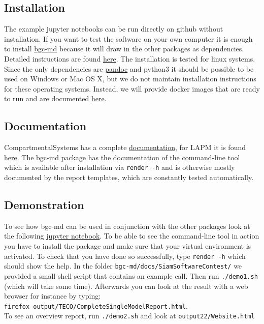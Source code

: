 \documentclass[a4paper]{article}
\begin{document}
\subsection{Installation}
The example jupyter notebooks can be run directly on github without installation. 
If you want to test the software on your own computer it is enough to install \href{https://github.com/MPIBGC-TEE/bgc-md}{bgc-md} because it will draw in the other packages as dependencies. Detailed instructions are found \href{https://github.com/MPIBGC-TEE/bgc-md#installation}{here}.
The installation is tested for linux systems. 
Since the only dependencies are \href{https://pandoc.org/installing.html}{pandoc} and python3 
it should be possible to be used on Windows or Mac OS X, but we do not maintain installation instructions for these operating systems.
Instead, we will provide docker images that are ready to run and are documented \href{https://github.com/MPIBGC-TEE/bgc-md/blob/master/docker_images/Readme.md}{here}. 


\subsection{Documentation}
CompartmentalSystems has a complete \href{http://compartmentalsystems.readthedocs.io/en/latest/}{documentation}, 
for LAPM it is found \href{http://lapm.readthedocs.io/en/latest/}{here}. 
The bgc-md package has the documentation of the command-line tool which is available after installation via  \texttt{render -h} 
and is otherwise mostly documented by the report templates, which are constantly tested automatically.

\subsection{Demonstration}
To see how bgc-md can be used in conjunction with the other packages look at the following \href{https://github.com/MPIBGC-TEE/bgc-md/blob/master/jupyter_notebooks/Examples/how_to_apply_toolkit_to_yaml_model.ipynb}{jupyter notebook}.
To be able to see the command-line tool in action you have to install the package and make sure that your virtual environment is activated. 
To check that you have done so successfully, type \texttt{render -h} which should show the help.
In the folder \texttt{bgc-md/docs/SiamSoftwareContest/} we provided a small shell script that contains an example call. 
Then run \texttt{./demo1.sh} (which will take some time).
Afterwards you can look at the result with a web browser for instance by typing:\\
\texttt{firefox output/TECO/CompleteSingleModelReport.html}.\\
To see an overview report, run \texttt{./demo2.sh} and look at \texttt{output22/Website.html}
\end{document}
